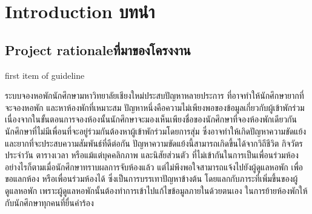 \chapter{\ifenglish Introduction \else บทนำ\fi}
\section{\ifenglish Project rationale\else ที่มาของโครงงาน\fi}

{first item of guideline}

ระบบจองหอพักนักศึกษามหาวิทยาลัยเชียงใหม่ประสบปัญหาหลายประการ ที่อาจทำให้นักศึกษายากที่จะจองหอพัก 
และหาห้องพักที่เหมาะสม ปัญหาหนึ่งคือความไม่เพียงพอของข้อมูลเกี่ยวกับผู้เข้าพักร่วม 
เนื่องจากในขั้นตอนการจองห้องนั้นนักศึกษาจะมองเห็นเพียงชื่อของนักศึกษาที่จองห้องพักเดียวกัน
นักศึกษาที่ไม่มีเพื่อนที่จะอยู่ร่วมกันต้องหาผู้เข้าพักร่วมโดยการสุ่ม ซึ่งอาจทำให้เกิดปัญหาความขัดแย้ง 
และยากที่จะประสบความสัมพันธ์ที่ดีต่อกัน ปัญหาความขัดแย้งนี้สามารถเกิดขึ้นได้จากวิถีชีวิต กิจวัตรประจำวัน 
ตารางเวลา หรือแม้แต่บุคคลิกภาพ และนิสัยส่วนตัว ที่ไม่เข้ากันในการเป็นเพื่อนร่วมห้อง
อย่างไรก็ตามเมื่อนักศึกษาทราบผลการจับห้องแล้ว แต่ไม่พึงพอใจสามารถแจ้งไปยังผู้ดูแลหอพัก 
เพื่อขอแลกห้อง หรือเพื่อนร่วมห้องได้ ซึ่งเป็นการบรรเทาปัญหาข้างต้น โดยแลกกับภาระที่เพิ่มขึ้นของผู้ดูแลหอพัก
เพราะผู้ดูแลหอพักนั้นต้องทำการเข้าไปแก้ไขข้อมูลภายในด้วยตนเอง ในการย้ายห้องพักให้กับนักศึกษาทุกคนที่ยื่นคำร้อง

